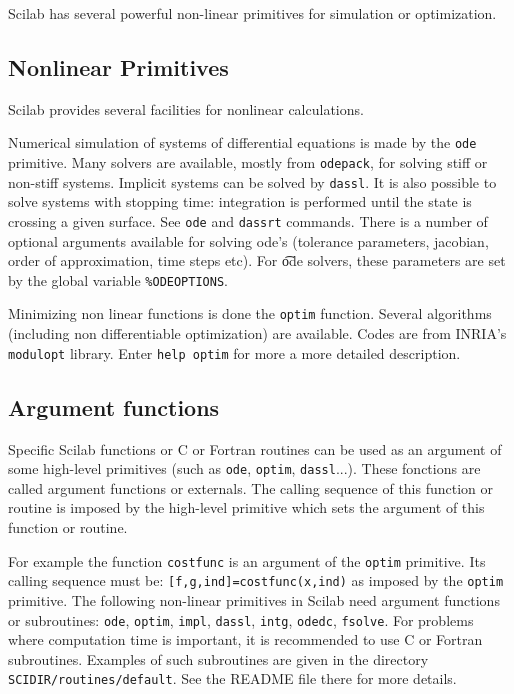 	Scilab has several powerful non-linear primitives for simulation
or optimization.
\subsection{Nonlinear Primitives}
Scilab provides several facilities for nonlinear calculations.

Numerical simulation of systems of differential equations is
made by the {\tt ode} primitive. Many solvers are available,
mostly from {\tt odepack}, for solving stiff or non-stiff systems.
Implicit systems can be solved by {\tt dassl}. It is also
possible to solve systems with stopping time: integration
is performed until the state is crossing a given surface.
See {\tt ode} and {\tt dassrt} commands. There is a number
of optional arguments available for solving ode's (tolerance
parameters, jacobian, order of approximation, time steps etc).
For {\t ode} solvers, these parameters are set by the global 
variable {\tt \%ODEOPTIONS}.

Minimizing non linear functions is done the {\tt optim} function. 
Several algorithms (including non differentiable optimization)
are available. Codes are from INRIA's {\tt modulopt} library.
Enter {\tt help optim} for more a more detailed description.

\subsection{Argument functions}
\label{refexternals}
Specific Scilab functions or C or Fortran routines can be used as an argument
of some high-level primitives (such as {\tt ode}, {\tt optim}, {\tt dassl}...).
These fonctions are called argument functions or externals.
The calling sequence of this function or routine is imposed by
the high-level primitive which sets the argument of this function or
routine.

For example the function {\tt costfunc} is an argument of 
the {\tt optim} primitive. Its calling sequence must be: 
{\tt [f,g,ind]=costfunc(x,ind)} as imposed by the {\tt optim} primitive.
The following non-linear primitives in Scilab need argument functions
or subroutines: 
{\tt ode}, {\tt optim}, {\tt impl}, {\tt dassl}, {\tt intg}, 
{\tt odedc}, {\tt fsolve}.
For problems where computation time is important, it is recommended
to use C or Fortran subroutines. Examples of such
subroutines are given in the directory {\tt SCIDIR/routines/default}.
See the README file there for more details.

